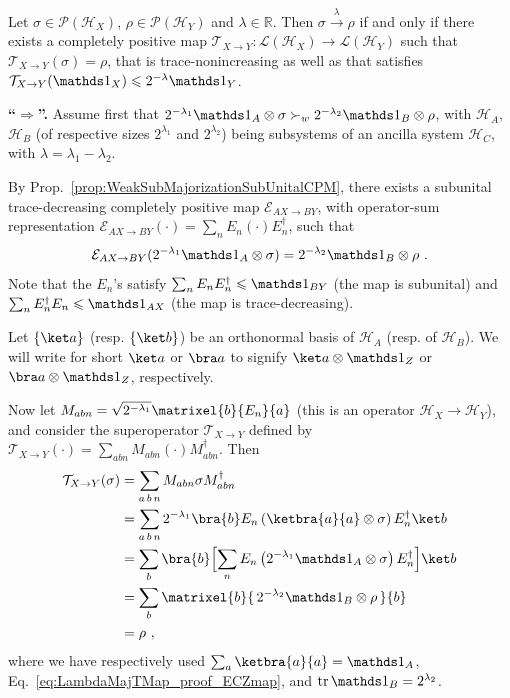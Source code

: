 \documentclass[11pt,a4paper]{article}
\def\Hs{\mathscr{H}}%
\newenvironment{myproof}[1][\proofname]{%
  \color{prooftextcolor} \footnotesize \proof[\itshape #1]\hspace*{1.2mm}%
}{\endproof}
\newcommand{\lambdamaj}[1]{\xrightarrow{#1}}
\newcommand{\LOps}{\mathscr{L}}
\newcommand{\POps}{\mathscr{P}}
\begin{document}
\begin{prop}
  \label{prop:LambdaMajorizationTMap}
  Let $\sigma\in\POps(\Hs_X)$, $\rho\in\POps(\Hs_Y)$ and $\lambda\in\mathbb R$. Then $\sigma\lambdamaj\lambda\rho$
  if and only if there exists a completely positive map
  $\mathcal T_{X\rightarrow Y} : \LOps(\Hs_X) \rightarrow \LOps(\Hs_Y)$ such
  that $\mathcal{T}_{X\rightarrow Y}(\sigma) = \rho$, that is trace-nonincreasing as well as that satisfies
  $\mathcal{T}_{X\rightarrow Y}(\Ident_X)\leqslant 2^{-\lambda}\Ident_Y$.
\end{prop}

\begin{myproof}[Proof of Prop.~\ref{prop:LambdaMajorizationTMap}]
  {\bf ``$\boldsymbol\Rightarrow$''.} \hspace*{1.5mm}
  Assume first that $2^{-\lambda_1}\Ident_A\otimes\sigma \succ_w 2^{-\lambda_2}\Ident_B\otimes\rho$, with
  $\Hs_A$, $\Hs_B$ (of respective sizes $2^{\lambda_1}$ and $2^{\lambda_2}$) being subsystems of an ancilla
  system $\Hs_C$, with $\lambda=\lambda_1-\lambda_2$.

  By Prop.~\ref{prop:WeakSubMajorizationSubUnitalCPM}, there exists a subunital trace-decreasing
  completely positive map $\mathcal{E}_{AX\rightarrow BY}$, with operator-sum representation
  $\mathcal{E}_{AX\rightarrow BY}(\cdot) = \sum_n E_n\left(\cdot\right)E_n^\dagger$, such that
  \begin{align}
    \label{eq:LambdaMajTMap_proof_ECZmap}
    \mathcal{E}_{AX\rightarrow BY}(2^{-\lambda_1}\Ident_A\otimes\sigma) = 2^{-\lambda_2}\Ident_B\otimes\rho\ .
  \end{align}
  Note that the $E_n$'s satisfy $\sum_n E_n E_n^\dagger \leqslant \Ident_{BY}$ (the map is subunital) and
  $\sum_n E_n^\dagger E_n \leqslant \Ident_{AX}$ (the map is trace-decreasing).

  Let $\{\ket a\}$ (resp. $\{\ket b\}$) be an orthonormal basis of $\Hs_A$ (resp. of $\Hs_B$). We will write
  for short $\ket a$ or $\bra a$ to signify $\ket a \otimes \Ident_Z$ or $\bra a \otimes \Ident_Z$, respectively.

  Now let $M_{abn} = \sqrt{2^{-\lambda_1}} \matrixel{b}{ E_n }{a}$ (this is an operator $\Hs_X\rightarrow\Hs_Y$),
  and consider the superoperator $\mathcal{T}_{X\rightarrow Y}$ defined by
  $\mathcal{T}_{X\rightarrow Y}(\cdot) = \sum_{abn} M_{abn}\left(\cdot\right)M_{abn}^\dagger$.
  Then
  \begin{align*}
    \mathcal{T}_{X\rightarrow Y}(\sigma) &= \sum_{a\,b\,n} M_{abn}\sigma M_{abn}^\dagger \\
    &= \sum_{a\,b\,n}  2^{-\lambda_1} \bra{b} E_n \left(\ketbra{a}{a}\otimes\sigma\right) E_n^\dagger \ket b \\
    &= \sum_{b}\bra{b} \Bigl[\sum_n E_n \left( 2^{-\lambda_1}\Ident_A\otimes\sigma\right) E_n^\dagger \Bigr] \ket b\\
    &= \sum_{b} \matrixel{b}{ \, 2^{-\lambda_2}\Ident_B\otimes\rho \, }{b} \\
    &= \rho\ ,
  \end{align*}
  where we have respectively used $\sum_a \ketbra{a}{a} = \Ident_A$, Eq.~\eqref{eq:LambdaMajTMap_proof_ECZmap},
  and $\tr \Ident_B = 2^{\lambda_2}$.


\end{myproof}
\end{document}
